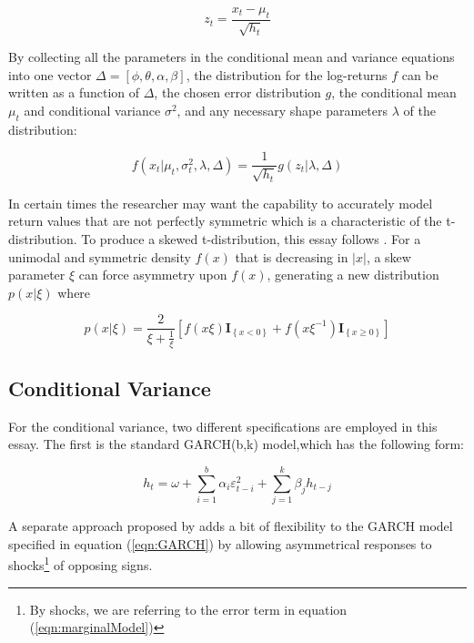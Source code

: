 \begin{equation} \label{eq:z_score_returns}
    z_{t} = \frac{x_{t} - \mu_{t}}{\sqrt{h_{t}}}
\end{equation}

By collecting all the parameters in the conditional mean and variance equations into one vector $\Delta = [\phi, \theta, \alpha, \beta]$, the distribution for the log-returns $f$ can be written as a function of $\Delta$, the chosen error distribution $g$, the conditional mean $\mu_{t}$ and conditional variance $\sigma^{2}$, and any necessary shape parameters $\lambda$ of the distribution:

\begin{equation} \label{eq:conditional_distr}
    f(x_{t} | \mu_{t}, \sigma^{2}_{t}, \lambda, \Delta) = \frac{1}{\sqrt{h_{t}}} g(z_{t} | \lambda, \Delta)
\end{equation}

In certain times the researcher may want the capability to accurately model return values that are not perfectly symmetric which is a characteristic of the t-distribution. To produce a skewed t-distribution, this essay follows \cite{Fernandez_Steel_1998}. For a unimodal and symmetric density $f\left(x\right)$ that is decreasing in $\left\vert x\right\vert$, a skew parameter $\xi$ can force asymmetry upon $f\left(x\right)$, generating a new distribution $p\left(x|\xi\right)$ where

\begin{equation}
	p\left(x|\xi \right) = \frac{2}{\xi + \frac{1}{\xi}} \left[f\left(x\xi\right) \mathbf{I}_{\left\{x < 0\right\}} + f\left(x\xi^{-1}\right) \mathbf{I}_{\left\{x \geq 0\right\}}\right]
\end{equation}


\subsection{Conditional Variance}

For the conditional variance, two different specifications are employed in this essay. The first is the standard GARCH(b,k) model,which has the following form:

\begin{equation} \label{eqn:GARCH}
	h_{t} = \omega + \sum_{i = 1}^{b}\alpha_{i} \varepsilon_{t - i}^{2} + \sum_{j = 1}^{k}\beta_{j} h_{t - j}
\end{equation}

A separate approach proposed by \cite{GJR_1993} adds a bit of flexibility to the GARCH model specified in equation (\ref{eqn:GARCH}) by allowing asymmetrical responses to shocks\footnote{By shocks, we are referring to the error term in equation (\ref{eqn:marginalModel})} of opposing signs. 

